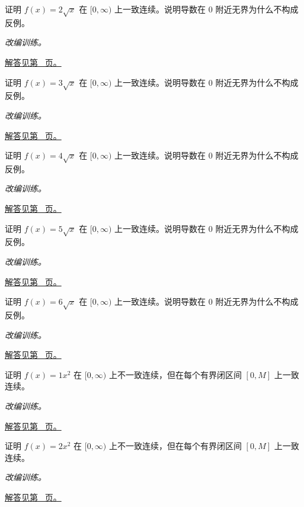 \documentclass[12pt,fontset=fandol]{ctexart}
\begin{document}
\begin{example}[一致连续与无界导数]\label{ex:c6q14}
证明 $f(x)=2\sqrt x$ 在 $[0,\infty)$ 上一致连续。说明导数在 $0$ 附近无界为什么不构成反例。
\par\textit{改编训练。}\par\hyperref[ans:c6q14]{解答见第~\pageref{ans:c6q14} 页。}
\end{example}
\begin{example}[一致连续与无界导数]\label{ex:c6q15}
证明 $f(x)=3\sqrt x$ 在 $[0,\infty)$ 上一致连续。说明导数在 $0$ 附近无界为什么不构成反例。
\par\textit{改编训练。}\par\hyperref[ans:c6q15]{解答见第~\pageref{ans:c6q15} 页。}
\end{example}
\begin{example}[一致连续与无界导数]\label{ex:c6q16}
证明 $f(x)=4\sqrt x$ 在 $[0,\infty)$ 上一致连续。说明导数在 $0$ 附近无界为什么不构成反例。
\par\textit{改编训练。}\par\hyperref[ans:c6q16]{解答见第~\pageref{ans:c6q16} 页。}
\end{example}
\begin{example}[一致连续与无界导数]\label{ex:c6q17}
证明 $f(x)=5\sqrt x$ 在 $[0,\infty)$ 上一致连续。说明导数在 $0$ 附近无界为什么不构成反例。
\par\textit{改编训练。}\par\hyperref[ans:c6q17]{解答见第~\pageref{ans:c6q17} 页。}
\end{example}
\begin{example}[一致连续与无界导数]\label{ex:c6q18}
证明 $f(x)=6\sqrt x$ 在 $[0,\infty)$ 上一致连续。说明导数在 $0$ 附近无界为什么不构成反例。
\par\textit{改编训练。}\par\hyperref[ans:c6q18]{解答见第~\pageref{ans:c6q18} 页。}
\end{example}
\begin{example}[用点列否定一致连续]\label{ex:c6q19}
证明 $f(x)=1x^2$ 在 $[0,\infty)$ 上不一致连续，但在每个有界闭区间 $[0,M]$ 上一致连续。
\par\textit{改编训练。}\par\hyperref[ans:c6q19]{解答见第~\pageref{ans:c6q19} 页。}
\end{example}
\begin{example}[用点列否定一致连续]\label{ex:c6q20}
证明 $f(x)=2x^2$ 在 $[0,\infty)$ 上不一致连续，但在每个有界闭区间 $[0,M]$ 上一致连续。
\par\textit{改编训练。}\par\hyperref[ans:c6q20]{解答见第~\pageref{ans:c6q20} 页。}
\end{example}
\end{document}
